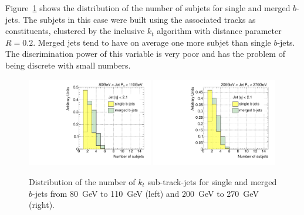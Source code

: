 
Figure~\ref{fig:nsubjetsinglemerged} shows the distribution of the number of subjets for single and merged $b$-jets. The subjets in this case were built using the associated tracks as constituents, clustered by the inclusive $k_t$ algorithm with distance parameter $R=0.2$.  Merged jets tend to have on average one more subjet than single $b$-jets. The discrimination power of this variable is %
 very poor and has the problem of being discrete with small numbers.

\begin{figure}[tp]
\centering
\includegraphics[width=0.49\textwidth]{FIGS/VarsSingleMerged/Nsubjets080.pdf}
\includegraphics[width=0.49\textwidth]{FIGS/VarsSingleMerged/Nsubjets200.pdf}
\caption{Distribution of the number of $k_t$ sub-track-jets for single and merged $b$-jets from 80~GeV to 110~GeV (left) and 200~GeV to 270~GeV (right).}
\label{fig:nsubjetsinglemerged}
\end{figure}


